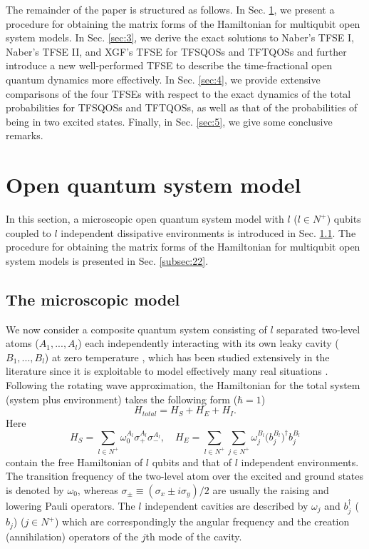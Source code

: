 \documentclass[
showpacs,  %
showkeys,  %
aps,       %
amsthm,    %
amsmath,   %
amsfonts,  %
amssymb    %
]{revtex4-1}          %
\begin{document}
The remainder of the paper is structured as follows. In Sec. \ref{sec:2}, we present a procedure for obtaining the matrix forms of the Hamiltonian for multiqubit open system models. In Sec. \ref{sec:3}, we derive the exact solutions to Naber's TFSE I, Naber's TFSE II, and XGF's TFSE for TFSQOSs and TFTQOSs and further introduce a new well-performed TFSE to describe the time-fractional open quantum dynamics more effectively. In Sec. \ref{sec:4}, we provide extensive comparisons of the four TFSEs with respect to the exact dynamics of the total probabilities for TFSQOSs and TFTQOSs, as well as that of the probabilities of being in two excited states. Finally, in Sec. \ref{sec:5}, we give some conclusive remarks.

\section{Open quantum system model}
\label{sec:2}
In this section, a microscopic open quantum system model with $l$ ($l\in{N^+}$) qubits coupled to $l$ independent dissipative environments is introduced in Sec. \ref{subsec:21}. The procedure for obtaining the matrix forms of the Hamiltonian for multiqubit open system models is presented in Sec. \ref{subsec:22}.

\subsection{The microscopic model}
\label{subsec:21}
We now consider a composite quantum system consisting of $l$ separated two-level atoms ($A_1, ..., A_l$) each independently interacting with its own leaky cavity ($B_1, ..., B_l$) at zero temperature \cite{Breuer2002,Bellomo2007}, which has been studied extensively in the literature since it is exploitable to model effectively many real situations \cite{Ferraro2009}. Following the rotating wave approximation, the Hamiltonian for the total system (system plus environment) takes the following form ($\hbar=1$)
\begin{equation}
\label{e1}
{H_{total}} = {H_S} + {H_E} + {H_I}.
\end{equation}
Here
\begin{equation}
\label{e2}
{H_S} = \sum\limits_{l \in N^+}{\omega_0^{{A_l}}\sigma_+ ^{{A_l}}\sigma_- ^{{A_l}}},\,\,\,\,\,\,
{H_E} = \sum\limits_{l\in N^+} {\sum\limits_{j \in N^+} {\omega_j^{{B_l}}(} b_j^{{B_l}}{)^\dag }b_j^{{B_l}}}
\end{equation}
contain the free Hamiltonian of $l$ qubits and that of $l$ independent environments. The transition frequency of the two-level atom over the excited and ground states is denoted by ${\omega _0}$, whereas ${\sigma _ \pm } \equiv ({\sigma _x} \pm i{\sigma _y})/2$ are usually the raising and lowering Pauli operators. The $l$ independent cavities are described by ${\omega _j}$ and $b_j^\dag$ (${b_j}$) ($j\in{N^+}$) which are correspondingly the angular frequency and the creation (annihilation) operators of the $j$th mode of the cavity.
\end{document}
